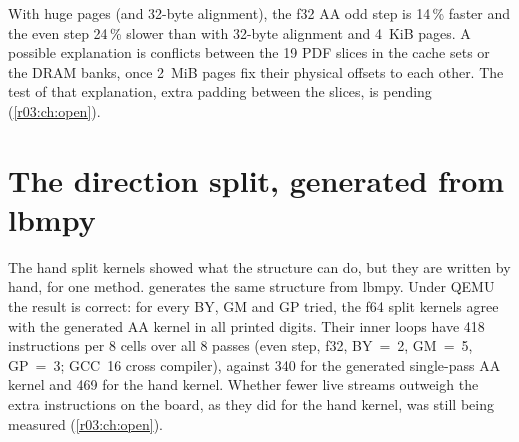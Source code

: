 With huge pages (and 32-byte alignment), the f32 AA odd step is 14\,\% faster and the even step
24\,\% slower than with 32-byte alignment and 4~KiB pages. A possible explanation is conflicts
between the 19 PDF slices in the cache sets or the DRAM banks, once 2~MiB pages fix their
physical offsets to each other. The test of that explanation, extra padding between the
slices, is pending (\cref{r03:ch:open}).

\section{The direction split, generated from lbmpy}\label{r03:sec:lever-gensplit}

The hand split kernels showed what the structure can do, but they are written by hand, for one
method.  generates the same structure from lbmpy. Under QEMU the result is
correct: for every BY, GM and GP tried, the f64 split kernels agree with the generated AA kernel
in all printed digits. Their inner loops have 418 instructions per 8 cells over all 8 passes
(even step, f32, BY~=~2, GM~=~5, GP~=~3; GCC~16 cross compiler), against 340 for the generated
single-pass AA kernel and 469 for the hand kernel. Whether fewer live streams outweigh the extra
instructions on the board, as they did for the hand kernel, was still being measured
(\cref{r03:ch:open}).
